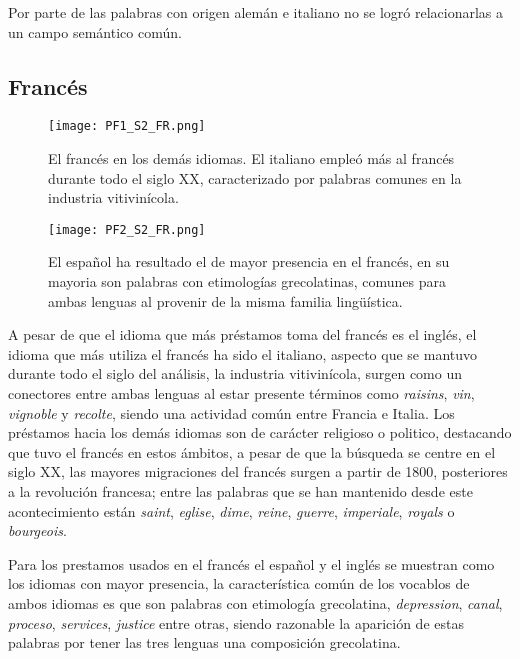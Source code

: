 Por parte de las palabras con origen alemán e italiano no se logró relacionarlas a un campo semántico común. 


\subsection{Francés} %

\begin{figure}[h!]
	\centering
	\texttt{[image: PF1\_S2\_FR.png]}
	\label{fig.ST_a_FR}
	\caption{El francés en los demás idiomas. El italiano empleó más al francés durante todo el siglo XX, caracterizado por palabras comunes en la industria vitivinícola.}
\end{figure}


\begin{figure}[h!]
	\centering
	\texttt{[image: PF2\_S2\_FR.png]}
	\label{fig.ST_b_FR}
	\caption{El español ha resultado el de mayor presencia en el francés, en su mayoria son palabras con etimologías grecolatinas, comunes para ambas lenguas al provenir de la misma familia lingüística.}
\end{figure}
		


A pesar de que el idioma que más préstamos toma del francés es el inglés,  el idioma que más utiliza el francés ha sido el italiano,  aspecto que se mantuvo durante todo el siglo del análisis,  la industria vitivinícola, surgen como un conectores entre ambas lenguas al estar presente términos como  \textit{raisins}, \textit{vin}, \textit{vignoble} y \textit{recolte},  siendo una actividad común entre Francia e Italia.  Los préstamos hacia los demás idiomas son de carácter religioso o politico, destacando que tuvo el francés en estos ámbitos, a pesar de que la búsqueda se centre en el siglo XX, las mayores migraciones del francés surgen a partir de 1800, posteriores a la revolución francesa; entre las palabras que se han mantenido desde este acontecimiento están  \textit{saint}, \textit{eglise}, \textit{dime}, \textit{reine}, \textit{guerre}, \textit{imperiale}, \textit{royals} o \textit{bourgeois}.  


Para los prestamos usados en el francés el español y el inglés se muestran como los idiomas con mayor presencia, la característica común de los vocablos de ambos idiomas es que son palabras con etimología grecolatina, 
\textit{depression}, \textit{canal}, \textit{proceso}, \textit{services}, \textit{justice} entre otras,  siendo razonable la aparición de estas palabras por tener las tres lenguas una composición grecolatina. 


